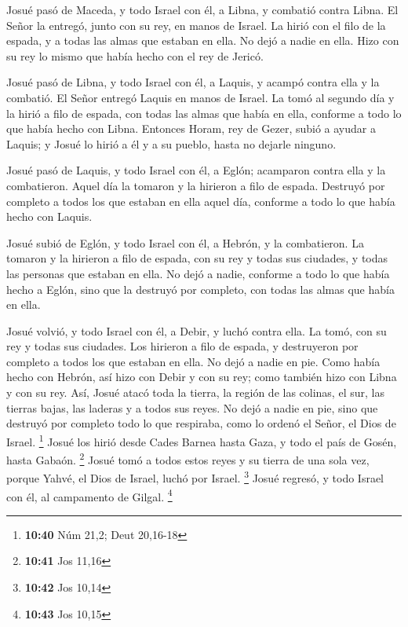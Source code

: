 Josué pasó de Maceda, y todo Israel con él, a Libna, y
combatió contra Libna.  El Señor la entregó, junto con su
rey, en manos de Israel. La hirió con el filo de la espada, y a todas
las almas que estaban en ella. No dejó a nadie en ella. Hizo con su rey
lo mismo que había hecho con el rey de Jericó.

 Josué pasó de Libna, y todo Israel con él, a Laquis, y
acampó contra ella y la combatió.  El Señor entregó
Laquis en manos de Israel. La tomó al segundo día y la hirió a filo de
espada, con todas las almas que había en ella, conforme a todo lo que
había hecho con Libna.  Entonces Horam, rey de Gezer,
subió a ayudar a Laquis; y Josué lo hirió a él y a su pueblo, hasta no
dejarle ninguno.

 Josué pasó de Laquis, y todo Israel con él, a Eglón;
acamparon contra ella y la combatieron.  Aquel día la
tomaron y la hirieron a filo de espada. Destruyó por completo a todos
los que estaban en ella aquel día, conforme a todo lo que había hecho
con Laquis.

 Josué subió de Eglón, y todo Israel con él, a Hebrón, y
la combatieron.  La tomaron y la hirieron a filo de
espada, con su rey y todas sus ciudades, y todas las personas que
estaban en ella. No dejó a nadie, conforme a todo lo que había hecho a
Eglón, sino que la destruyó por completo, con todas las almas que había
en ella.

 Josué volvió, y todo Israel con él, a Debir, y luchó
contra ella.  La tomó, con su rey y todas sus ciudades.
Los hirieron a filo de espada, y destruyeron por completo a todos los
que estaban en ella. No dejó a nadie en pie. Como había hecho con
Hebrón, así hizo con Debir y con su rey; como también hizo con Libna y
con su rey.  Así, Josué atacó toda la tierra, la región
de las colinas, el sur, las tierras bajas, las laderas y a todos sus
reyes. No dejó a nadie en pie, sino que destruyó por completo todo lo
que respiraba, como lo ordenó el Señor, el Dios de Israel. \footnote{\textbf{10:40}
  Núm 21,2; Deut 20,16-18}  Josué los hirió desde Cades
Barnea hasta Gaza, y todo el país de Gosén, hasta Gabaón. \footnote{\textbf{10:41}
  Jos 11,16}  Josué tomó a todos estos reyes y su tierra
de una sola vez, porque Yahvé, el Dios de Israel, luchó por Israel.
\footnote{\textbf{10:42} Jos 10,14}  Josué regresó, y
todo Israel con él, al campamento de Gilgal. \footnote{\textbf{10:43}
  Jos 10,15}

